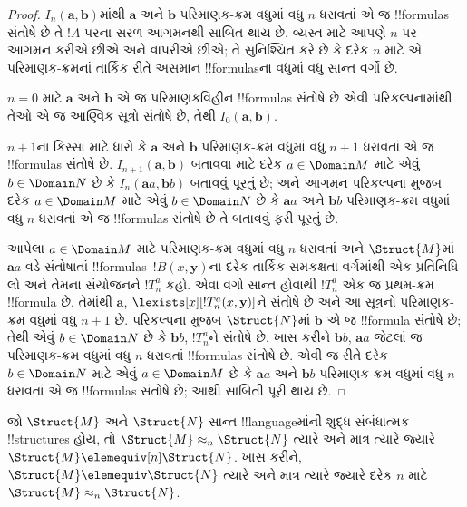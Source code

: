 \documentclass[../../../include/open-logic-section]{subfiles}
\begin{document}
\begin{proof}
  $I_n(\mathbf{a},\mathbf{b})$માંથી $\mathbf{a}$ અને $\mathbf{b}$
  પરિમાણક-ક્રમ વધુમાં વધુ $n$ ધરાવતાં એ જ !!{formula}s સંતોષે છે તે
  $!A$ પરના સરળ આગમનથી સાબિત થાય છે. વ્યસ્ત માટે આપણે $n$ પર આગમન
  કરીએ છીએ અને  વાપરીએ છીએ; તે સુનિશ્ચિત કરે છે
  કે દરેક $n$ માટે એ પરિમાણક-ક્રમનાં તાર્કિક રીતે અસમાન !!{formula}sના વધુમાં
  વધુ સાન્ત વર્ગો છે.

  $n=0$ માટે $\mathbf{a}$ અને $\mathbf{b}$ એ જ પરિમાણકવિહીન
  !!{formula}s સંતોષે છે એવી પરિકલ્પનામાંથી તેઓ એ જ આણ્વિક સૂત્રો
  સંતોષે છે, તેથી $I_0(\mathbf{a},\mathbf{b})$.

  $n+1$ના કિસ્સા માટે ધારો કે $\mathbf{a}$ અને $\mathbf{b}$
  પરિમાણક-ક્રમ વધુમાં વધુ $n+1$ ધરાવતાં એ જ !!{formula}s સંતોષે છે.
  $I_{n+1}(\mathbf{a},\mathbf{b})$ બતાવવા માટે દરેક $a \in \Domain M$
  માટે એવું $b \in \Domain N$ છે કે $I_n(\mathbf{a}a,\mathbf{b}b)$
  બતાવવું પૂરતું છે; અને આગમન પરિકલ્પના મુજબ દરેક $a \in \Domain M$
  માટે એવું $b \in \Domain N$ છે કે $\mathbf{a}a$ અને $\mathbf{b}b$
  પરિમાણક-ક્રમ વધુમાં વધુ $n$ ધરાવતાં એ જ !!{formula}s સંતોષે છે તે
  બતાવવું ફરી પૂરતું છે.

  આપેલા $a \in \Domain M$ માટે પરિમાણક-ક્રમ વધુમાં વધુ $n$ ધરાવતાં
  અને $\Struct{M}$માં $\mathbf{a}a$ વડે સંતોષાતાં
  !!{formula}s~$!B(x,\mathbf{y})$ના દરેક તાર્કિક સમકક્ષતા-વર્ગમાંથી એક
  પ્રતિનિધિ લો અને તેમના સંયોજનને $!T^a_n$ કહો. એવા વર્ગો સાન્ત હોવાથી
  $!T^a_n$ એક જ પ્રથમ-ક્રમ !!{formula} છે. તેમાંથી $\mathbf{a}$,
  $\lexists[x][!T^a_n(x,\mathbf{y})]$ને સંતોષે છે અને આ સૂત્રનો
  પરિમાણક-ક્રમ વધુમાં વધુ $n+1$ છે. પરિકલ્પના મુજબ $\Struct{N}$માં
  $\mathbf{b}$ એ જ !!{formula} સંતોષે છે; તેથી એવું $b \in \Domain N$
  છે કે $\mathbf{b}b$, $!T^a_n$ને સંતોષે છે. ખાસ કરીને
  $\mathbf{b}b$, $\mathbf{a}a$ જેટલાં જ પરિમાણક-ક્રમ વધુમાં વધુ $n$
  ધરાવતાં !!{formula}s સંતોષે છે. એવી જ રીતે દરેક $b \in \Domain N$
  માટે એવું $a\in \Domain M$ છે કે $\mathbf{a}a$ અને $\mathbf{b}b$
  પરિમાણક-ક્રમ વધુમાં વધુ $n$ ધરાવતાં એ જ !!{formula}s સંતોષે છે; આથી
  સાબિતી પૂરી થાય છે.
\end{proof}

\begin{cor}
  જો $\Struct{M}$ અને $\Struct{N}$ સાન્ત !!{language}માંની શુદ્ધ
  સંબંધાત્મક !!{structure}s હોય, તો $\Struct{M} \approx_n\Struct{N}$
  ત્યારે અને માત્ર ત્યારે જ્યારે $\Struct{M} \elemequiv[n]
  \Struct{N}$. ખાસ કરીને, $\Struct{M} \elemequiv \Struct{N}$ ત્યારે
  અને માત્ર ત્યારે જ્યારે દરેક $n$ માટે $\Struct{M} \approx_n
  \Struct{N}$.
\end{cor}
\end{document}
